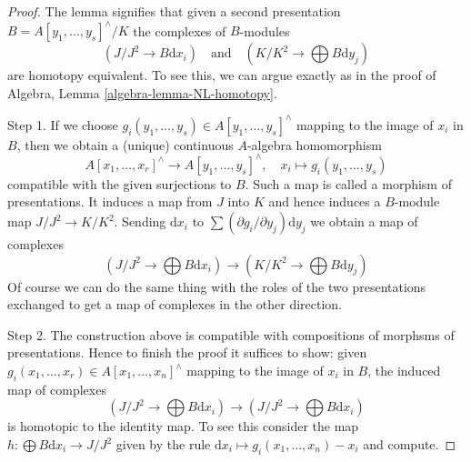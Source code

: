 \documentclass{stacks-project}
\theoremstyle{plain}
\theoremstyle{definition}
\theoremstyle{remark}
\numberwithin{equation}{subsection}
\begin{document}
\begin{proof}
The lemma signifies that given a second presentation
$B = A[y_1, \ldots, y_s]^\wedge / K$ the complexes of $B$-modules
$$
(J/J^2 \to B\text{d}x_i)
\quad\text{and}\quad
(K/K^2 \to \bigoplus B\text{d}y_j)
$$
are homotopy equivalent. To see this, we can argue exactly as in
the proof of Algebra, Lemma \ref{algebra-lemma-NL-homotopy}.

\medskip\noindent
Step 1. If we choose $g_i(y_1, \ldots, y_s) \in A[y_1, \ldots, y_s]^\wedge$
mapping to the image of $x_i$ in $B$, then we obtain a (unique) continuous
$A$-algebra homomorphism
$$
A[x_1, \ldots, x_r]^\wedge \to A[y_1, \ldots, y_s]^\wedge,\quad
x_i \mapsto g_i(y_1, \ldots, y_s)
$$
compatible with the given surjections to $B$. Such a map is called
a morphism of presentations. It induces a map from $J$ into $K$
and hence induces a $B$-module map $J/J^2 \to K/K^2$. Sending
$\text{d}x_i$ to $\sum (\partial g_i/\partial y_j)\text{d}y_j$
we obtain a map of complexes
$$
(J/J^2 \to \bigoplus B\text{d}x_i)
\longrightarrow
(K/K^2 \to \bigoplus B\text{d}y_j)
$$
Of course we can do the same thing with the roles of the two presentations
exchanged to get a map of complexes in the other direction.

\medskip\noindent
Step 2. The construction above is compatible with compositions of morphsms
of presentations. Hence to finish the proof it suffices to show: given
$g_i(x_1, \ldots, x_r) \in A[x_1, \ldots, x_n]^\wedge$
mapping to the image of $x_i$ in $B$, the induced map of complexes
$$
(J/J^2 \to \bigoplus B\text{d}x_i)
\longrightarrow
(J/J^2 \to \bigoplus B\text{d}x_i)
$$
is homotopic to the identity map. To see this consider the map
$h : \bigoplus B \text{d}x_i \to J/J^2$ given by the rule
$\text{d}x_i \mapsto g_i(x_1, \ldots, x_n) - x_i$ and compute.
\end{proof}
\end{document}
